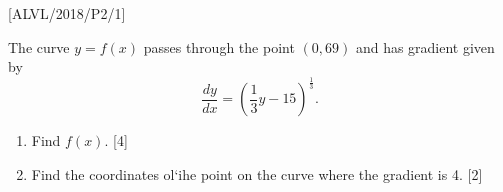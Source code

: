 \item {[}ALVL/2018/P2/1{]}

The curve $y=f\left(x\right)$ passes through the point $\left(0,69\right)$
and has gradient given by 
\[
\frac{dy}{dx}=\left(\frac{1}{3}y-15\right)^{\frac{1}{3}}.
\]

\begin{enumerate}
\item Find $f\left(x\right)$.\hfill{} {[}4{]}
\item Find the coordinates ol\textquoteleft ihe point on the curve where
the gradient is 4. \hfill{}{[}2{]}
\end{enumerate}
